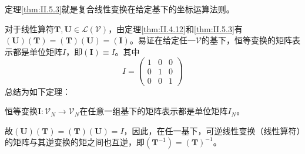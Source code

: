 \documentclass[main.tex]{subfiles}
\begin{document}
定理\ref{thm:II.5.3}就是复合线性变换在给定基下的坐标运算法则。

对于线性算符$\mathbf{T},\mathbf{U}\in\mathcal{L}\left(\mathcal{V}\right)$，由定理\ref{thm:II.4.12}和\ref{thm:II.5.3}有$\left(\mathbf{U}\right)\left(\mathbf{T}\right)=\left(\mathbf{T}\right)\left(\mathbf{U}\right)=\left(\mathbf{I}\right)$。易证在给定任一$\mathcal{V}$的基下，恒等变换的矩阵表示都是单位矩阵$I$，即$\left(\mathbf{I}\right)\equiv I$。其中
\[I=\begin{pmatrix}1&0&0\\0&1&0\\0&0&1\end{pmatrix}\]
总结为如下定理：

\begin{theorem}
恒等变换$\mathbf{I}:\mathcal{V}_N\rightarrow\mathcal{V}_N$在任意一组基下的矩阵表示都是单位矩阵$I_N$。
\end{theorem}

故$\left(\mathbf{U}\right)\left(\mathbf{T}\right)=\left(\mathbf{T}\right)\left(\mathbf{U}\right)=I$，因此，在任一基下，可逆线性变换（线性算符）的矩阵与其逆变换的矩之间也互逆，即$\left(\mathbf{T}^{-1}\right)=\left(\mathbf{T}\right)^{-1}$。
\end{document}
